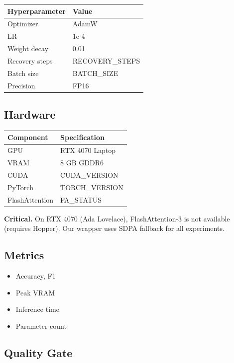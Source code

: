 \begin{table}[H]
\centering
\small
\begin{tabular}{ll}
\toprule
\textbf{Hyperparameter} & \textbf{Value} \\
\midrule
Optimizer & AdamW \\
LR & 1e-4 \\
Weight decay & 0.01 \\
Recovery steps & {{RECOVERY\_STEPS}} \\
Batch size & {{BATCH\_SIZE}} \\
Precision & FP16 \\
\bottomrule
\end{tabular}
\end{table}

\subsection{Hardware}

\begin{table}[H]
\centering
\small
\begin{tabular}{ll}
\toprule
\textbf{Component} & \textbf{Specification} \\
\midrule
GPU & RTX 4070 Laptop \\
VRAM & 8 GB GDDR6 \\
CUDA & {{CUDA\_VERSION}} \\
PyTorch & {{TORCH\_VERSION}} \\
FlashAttention & {{FA\_STATUS}} \\
\bottomrule
\end{tabular}
\end{table}

\textbf{Critical.} On RTX 4070 (Ada Lovelace), FlashAttention-3 is not available 
(requires Hopper). Our wrapper uses SDPA fallback for all experiments.

\subsection{Metrics}

\begin{itemize}
\item Accuracy, F1
\item Peak VRAM
\item Inference time
\item Parameter count

\end{itemize}
\subsection{Quality Gate}

